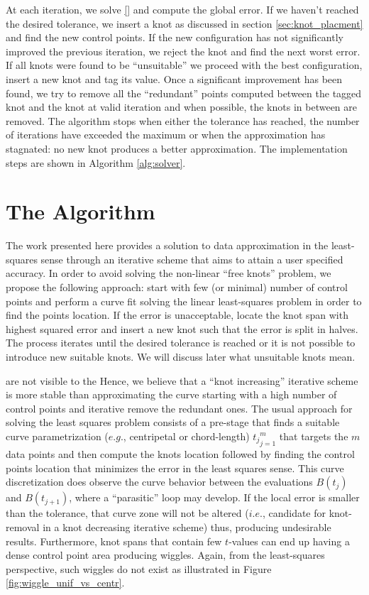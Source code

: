 {At each iteration, we solve \eqref{} and compute the global error. If we haven't reached the desired tolerance, 
we insert a knot as discussed in section \ref{sec:knot_placment} and find the new control points. If the 
new configuration has not significantly improved the previous iteration, we reject the knot and find the next worst error. 
 If all knots were found to be ``unsuitable'' we proceed with the best configuration, insert a new knot and tag its 
 value. Once a significant improvement has been found, we try to remove all the ``redundant'' points computed between the tagged knot and the 
 knot at valid iteration and when possible, the knots in between are removed. The algorithm stops when either the tolerance has reached, 
 the number of iterations have exceeded the maximum or when the approximation has stagnated: no new knot 
 produces a better approximation. The implementation steps are shown in Algorithm \ref{alg:solver}. 

 
 
 \section{The Algorithm}
 
 The work presented here provides a solution to data approximation in the least-squares sense through an iterative 
 scheme that aims to attain a user specified accuracy. 
In order to avoid solving the non-linear ``free knots'' problem, we propose the following approach: start with few (or minimal) number of control points and perform a curve fit solving the linear least-squares problem in order to find 
the points location. If the error is unacceptable, locate the knot span with highest squared error and insert a  new knot such that the error is split in halves. The process iterates until the desired tolerance is reached or it is not 
possible to introduce new suitable knots. We will discuss later what unsuitable knots mean. 


 
 
 are not visible to the 
Hence, we believe that 
a ``knot increasing'' iterative scheme is more stable than approximating the curve starting with a high number of control points and iterative remove the redundant ones. 
The usual approach for solving the least squares problem consists of a pre-stage that finds a suitable curve parametrization ($e.g.$, centripetal or chord-length)  ${t_j}_{j=1}^m$ that targets the $m$ data points and
then compute the knots location followed by finding the control points location that minimizes the error in the least squares sense. 
This curve discretization does observe the curve behavior between the evaluations $B(t_j)$ and $B(t_{j+1})$, where a ``parasitic'' loop may develop. If the local error is smaller than the tolerance, that 
curve zone will not be altered ($i.e.$, candidate for knot-removal in a knot decreasing iterative scheme) thus, producing undesirable results. Furthermore, knot spans that contain few $t$-values can end up having a dense control point area 
producing wiggles. Again, from the least-squares perspective, such wiggles do not exist as illustrated in Figure \ref{fig:wiggle_unif_vs_centr}.



}
